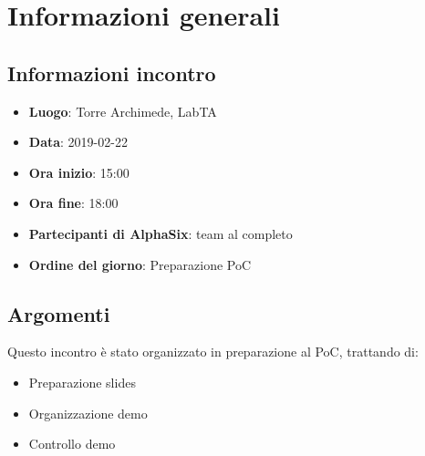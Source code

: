 \newcommand{\documento}{\VI}
\newcommand{\nomedocumentofisico}{VI\_2019-02-22.pdf}
\newcommand{\redazione}{\MM}
\newcommand{\verifica}{\CV}
\newcommand{\approvazione}{\SG}
\newcommand{\versione}{1.0.0}
\newcommand{\uso}{Interno}
\newcommand{\destinateTo}{\gruppo}
\newcommand{\datacreazione}{23 febbraio 2019}
\newcommand{\datamodifica}{25 febbraio 2019}
\newcommand{\stato}{Approvato}

\def\TABELLE{false}	%
\def\FIGURE{false} 	%






    

    	
    
    \section{Informazioni generali}
		\subsection{Informazioni incontro}
			\begin{itemize}
				\item {\textbf{Luogo}: Torre Archimede, LabTA}
				\item {\textbf{Data}: 2019-02-22}
				\item {\textbf{Ora inizio}: 15:00}
				\item {\textbf{Ora fine}: 18:00}
				\item {\textbf{Partecipanti di AlphaSix}: team al completo}
				\item {\textbf{Ordine del giorno}: Preparazione PoC}
			\end{itemize}

        \subsection{Argomenti}
            Questo incontro è stato organizzato in preparazione al PoC, trattando di:
            \begin{itemize}
                \item Preparazione slides
                \item Organizzazione demo
                \item Controllo demo
            \end{itemize}

